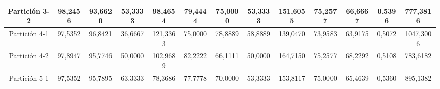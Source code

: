 \documentclass[12pt]{article}
\begin{document}
\begin{table}[H]
{\begin{tabular}{|c|cccc|cccc|cccc|}
Partición 3-2 & \multicolumn{1}{c|}{98,2456}                                                  & \multicolumn{1}{c|}{93,6620}                                                 & \multicolumn{1}{c|}{53,3333} & 98,4654  & \multicolumn{1}{c|}{79,4444}                                                  & \multicolumn{1}{c|}{75,0000}                                                 & \multicolumn{1}{c|}{53,3333} & 151,6055 & \multicolumn{1}{c|}{75,2577}                                                  & \multicolumn{1}{c|}{66,6667}                                                 & \multicolumn{1}{c|}{0,5396}  & 777,3816  \\ \hline
Partición 4-1 & \multicolumn{1}{c|}{97,5352}                                                  & \multicolumn{1}{c|}{96,8421}                                                 & \multicolumn{1}{c|}{36,6667} & 121,3363 & \multicolumn{1}{c|}{75,0000}                                                  & \multicolumn{1}{c|}{78,8889}                                                 & \multicolumn{1}{c|}{58,8889} & 139,0470 & \multicolumn{1}{c|}{73,9583}                                                  & \multicolumn{1}{c|}{63,9175}                                                 & \multicolumn{1}{c|}{0,5072}  & 1047,3006 \\ \hline
Partición 4-2 & \multicolumn{1}{c|}{97,8947}                                                  & \multicolumn{1}{c|}{95,7746}                                                 & \multicolumn{1}{c|}{50,0000} & 102,9689 & \multicolumn{1}{c|}{82,2222}                                                  & \multicolumn{1}{c|}{66,1111}                                                 & \multicolumn{1}{c|}{50,0000} & 164,7150 & \multicolumn{1}{c|}{75,2577}                                                  & \multicolumn{1}{c|}{68,2292}                                                 & \multicolumn{1}{c|}{0,5108}  & 783,6182  \\ \hline
Partición 5-1 & \multicolumn{1}{c|}{97,5352}                                                  & \multicolumn{1}{c|}{95,7895}                                                 & \multicolumn{1}{c|}{63,3333} & 78,3686  & \multicolumn{1}{c|}{77,7778}                                                  & \multicolumn{1}{c|}{70,0000}                                                 & \multicolumn{1}{c|}{53,3333} & 153,8117 & \multicolumn{1}{c|}{75,0000}                                                  & \multicolumn{1}{c|}{65,4639}                                                 & \multicolumn{1}{c|}{0,5360}  & 895,1382  \\ \hline

\end{tabular}}
\end{table}
\end{document}
